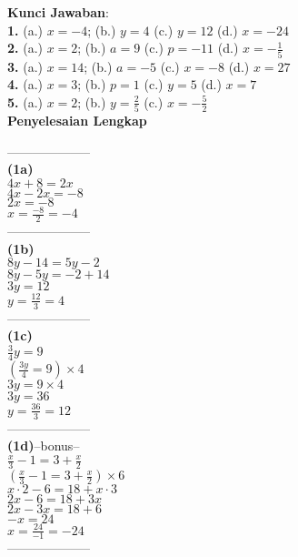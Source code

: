\documentclass[11pt,a4paper]{article}
\begin{document}
\begin{flushleft}
{\bf Kunci Jawaban}:\\
{\bf 1.} (a.) $x=-4$; \quad (b.) $y=4$ \quad  (c.) $y=12$ \quad (d.) $x=-24$\\
{\bf 2.} (a.) $x=2$; \quad (b.) $a=9$ \quad  (c.) $p=-11$ \quad (d.) $x=-\frac {1}{5}$\\
{\bf 3.} (a.) $x=14$; \quad (b.) $a=-5$ \quad  (c.) $x=-8$ \quad (d.) $x=27$\\
{\bf 4.} (a.) $x=3$; \quad (b.) $p=1$ \quad  (c.) $y=5$ \quad (d.) $x=7$\\
{\bf 5.} (a.) $x=2$; \quad (b.) $y=\frac {2}{5}$ \quad  (c.) $x=-\frac{5}{2}$\\

\newpage
{\bf Penyelesaian Lengkap}\\[0.3em]
\begin{minipage}{5.5cm}
{\color{blue} --------------------}\\
{\bf (1a)}\\
$4x+8=2x$\\
$4x-2x=-8$\\
$2x=-8$\\
$x=\frac{-8}{2}=-4$\\
{\color{blue} --------------------}\\
{\bf (1b)}\\
$8y-14=5y-2$\\
$8y-5y=-2+14$\\
$3y=12$\\
$y=\frac{12}{3}=4$\\
{\color{blue} --------------------}\\
{\bf (1c)}\\
$\frac{3}{4}y=9$\\
$(\frac{3y}{4}=9)\times 4$\\
$3y=9\times 4$\\
$3y=36$\\
$y=\frac{36}{3}=12$\\
{\color{blue} --------------------}\\
{\bf (1d)}--bonus--\\
$\frac{x}{3}-1=3+\frac{x}{2}$\\
$(\frac{x}{3}-1=3+\frac{x}{2})\times 6$\\
$x\cdot2 - 6=18 + x\cdot3$\\
$2x-6=18+3x$\\
$2x-3x=18+6$\\
$-x=24$\\
$x=\frac{24}{-1}=-24$\\
{\color{blue} --------------------}\\

\end{minipage}
\end{flushleft}
\end{document}

